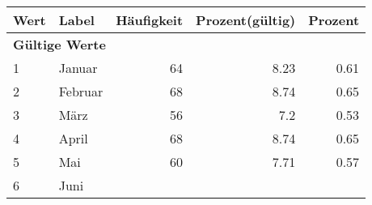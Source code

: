      \begin{longtable}{lXrrr}
     \toprule
     \textbf{Wert} & \textbf{Label} & \textbf{Häufigkeit} & \textbf{Prozent(gültig)} & \textbf{Prozent} \\
     \endhead
     \midrule
     \multicolumn{5}{l}{\textbf{Gültige Werte}}\\

     1 &
     \multicolumn{1}{X}{ Januar   } &


       \num{64} &
       \num[round-mode=places,round-precision=2]{8,23} &
         \num[round-mode=places,round-precision=2]{0,61} \\

     2 &
     \multicolumn{1}{X}{ Februar   } &


       \num{68} &
       \num[round-mode=places,round-precision=2]{8,74} &
         \num[round-mode=places,round-precision=2]{0,65} \\

     3 &
     \multicolumn{1}{X}{ März   } &


       \num{56} &
       \num[round-mode=places,round-precision=2]{7,2} &
         \num[round-mode=places,round-precision=2]{0,53} \\

     4 &
     \multicolumn{1}{X}{ April   } &


       \num{68} &
       \num[round-mode=places,round-precision=2]{8,74} &
         \num[round-mode=places,round-precision=2]{0,65} \\

     5 &
     \multicolumn{1}{X}{ Mai   } &


       \num{60} &
       \num[round-mode=places,round-precision=2]{7,71} &
         \num[round-mode=places,round-precision=2]{0,57} \\

     6 &
     \multicolumn{1}{X}{ Juni   } &



\end{longtable}
